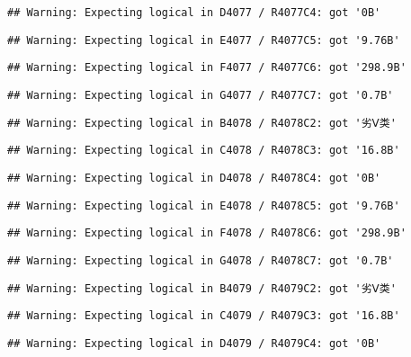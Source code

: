 \documentclass[
]{article}
\begin{document}
\begin{verbatim}
## Warning: Expecting logical in D4077 / R4077C4: got '0B'
\end{verbatim}

\begin{verbatim}
## Warning: Expecting logical in E4077 / R4077C5: got '9.76B'
\end{verbatim}

\begin{verbatim}
## Warning: Expecting logical in F4077 / R4077C6: got '298.9B'
\end{verbatim}

\begin{verbatim}
## Warning: Expecting logical in G4077 / R4077C7: got '0.7B'
\end{verbatim}

\begin{verbatim}
## Warning: Expecting logical in B4078 / R4078C2: got '劣Ⅴ类'
\end{verbatim}

\begin{verbatim}
## Warning: Expecting logical in C4078 / R4078C3: got '16.8B'
\end{verbatim}

\begin{verbatim}
## Warning: Expecting logical in D4078 / R4078C4: got '0B'
\end{verbatim}

\begin{verbatim}
## Warning: Expecting logical in E4078 / R4078C5: got '9.76B'
\end{verbatim}

\begin{verbatim}
## Warning: Expecting logical in F4078 / R4078C6: got '298.9B'
\end{verbatim}

\begin{verbatim}
## Warning: Expecting logical in G4078 / R4078C7: got '0.7B'
\end{verbatim}

\begin{verbatim}
## Warning: Expecting logical in B4079 / R4079C2: got '劣Ⅴ类'
\end{verbatim}

\begin{verbatim}
## Warning: Expecting logical in C4079 / R4079C3: got '16.8B'
\end{verbatim}

\begin{verbatim}
## Warning: Expecting logical in D4079 / R4079C4: got '0B'
\end{verbatim}
\end{document}
